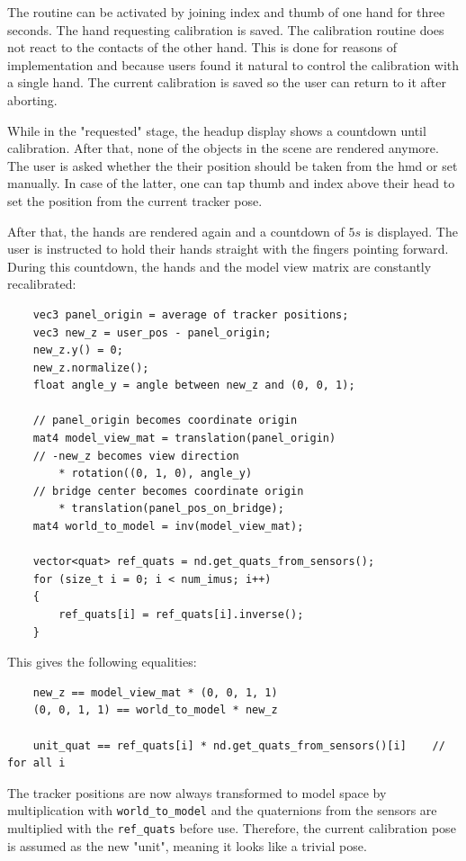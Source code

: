 \documentclass[hyperref, bachelorofscience]{cgvpub}
\begin{document}
The routine can be activated by joining index and thumb of one hand for three seconds. The hand requesting calibration is saved. The calibration routine does not react to the contacts of the other hand. This is done for reasons of implementation and because users found it natural to control the calibration with a single hand. The current calibration is saved so the user can return to it after aborting. 

While in the "requested" stage, the headup display shows a countdown until calibration. After that, none of the objects in the scene are rendered anymore. The user is asked whether the their position should be taken from the \acrshort{hmd} or set manually. In case of the latter, one can tap thumb and index above their head to set the position from the current tracker pose.

After that, the hands are rendered again and a countdown of $ 5s $ is displayed. The user is instructed to hold their hands straight with the fingers pointing forward. During this countdown, the hands and the model view matrix are constantly recalibrated:
\vspace{.3cm}
\begin{lstlisting}
	vec3 panel_origin = average of tracker positions;
	vec3 new_z = user_pos - panel_origin;
	new_z.y() = 0;
	new_z.normalize();
	float angle_y = angle between new_z and (0, 0, 1);
	
	// panel_origin becomes coordinate origin
	mat4 model_view_mat = translation(panel_origin)
	// -new_z becomes view direction
		* rotation((0, 1, 0), angle_y)
	// bridge center becomes coordinate origin
		* translation(panel_pos_on_bridge);
	mat4 world_to_model = inv(model_view_mat);
	
	vector<quat> ref_quats = nd.get_quats_from_sensors();
	for (size_t i = 0; i < num_imus; i++)
	{
		ref_quats[i] = ref_quats[i].inverse();
	}
\end{lstlisting}

This gives the following equalities:

\begin{lstlisting}
	new_z == model_view_mat * (0, 0, 1, 1)
	(0, 0, 1, 1) == world_to_model * new_z
	
	unit_quat == ref_quats[i] * nd.get_quats_from_sensors()[i]    // for all i
\end{lstlisting}

The tracker positions are now always transformed to model space by multiplication with \lstinline|world_to_model| and the quaternions from the sensors are multiplied with the \lstinline|ref_quats| before use. Therefore, the current calibration pose is assumed as the new "unit", meaning it looks like a trivial pose. 
\end{document}
